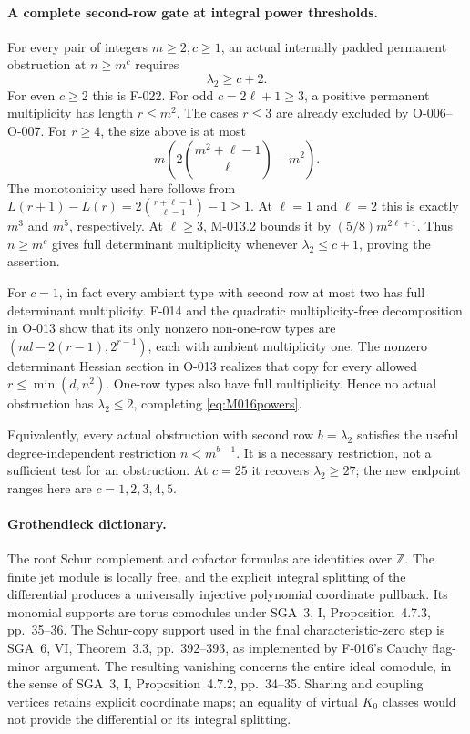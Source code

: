 \paragraph{A complete second-row gate at integral power thresholds.}
For every pair of integers \(m\geq2,c\geq1\), an actual
internally padded permanent obstruction at \(n\geq m^c\)
requires
\begin{equation}\label{eq:M016powers}
                              \lambda_2\geq c+2.
\end{equation}
For even \(c\geq2\) this is F-022. For odd
\(c=2\ell+1\geq3\), a positive permanent multiplicity
has length \(r\leq m^2\). The cases \(r\leq3\)
are already excluded by O-006--O-007. For \(r\geq4\),
the size above is at most
\[
 m\left(2\binom{m^2+\ell-1}{\ell}-m^2\right).
\]
The monotonicity used here follows from
\(L(r+1)-L(r)=2\binom{r+\ell-1}{\ell-1}-1\geq1\).
At \(\ell=1\) and \(\ell=2\) this is exactly
\(m^3\) and \(m^5\), respectively. At \(\ell\geq3\),
M-013.2 bounds it by \((5/8)m^{2\ell+1}\).
Thus \(n\geq m^c\) gives full determinant multiplicity
whenever \(\lambda_2\leq c+1\), proving the assertion.

For \(c=1\), in fact every ambient type with second row
at most two has full determinant multiplicity. F-014 and
the quadratic multiplicity-free decomposition in O-013
show that its only nonzero non-one-row types are
\((nd-2(r-1),2^{r-1})\), each with ambient multiplicity one.
The nonzero determinant Hessian section in O-013 realizes
that copy for every allowed \(r\leq\min(d,n^2)\).
One-row types also have full multiplicity. Hence no actual
obstruction has \(\lambda_2\leq2\), completing
\eqref{eq:M016powers}.

Equivalently, every actual obstruction with second row
\(b=\lambda_2\) satisfies the useful degree-independent
restriction \(n<m^{b-1}\). It is a necessary restriction,
not a sufficient test for an obstruction. At \(c=25\)
it recovers \(\lambda_2\geq27\); the new endpoint
ranges here are \(c=1,2,3,4,5\).

\paragraph{Grothendieck dictionary.}
The root Schur complement and cofactor formulas are
identities over \(\mathbb Z\). The finite jet module is
locally free, and the explicit integral splitting of the
differential produces a universally injective polynomial
coordinate pullback. Its monomial supports are torus
comodules under SGA~3, I, Proposition~4.7.3, pp.~35--36.
The Schur-copy support used in the final characteristic-zero
step is SGA~6, VI, Theorem~3.3, pp.~392--393, as implemented
by F-016's Cauchy flag-minor argument. The resulting
vanishing concerns the entire ideal comodule, in the sense
of SGA~3, I, Proposition~4.7.2, pp.~34--35.
Sharing and coupling vertices retains explicit coordinate
maps; an equality of virtual \(K_0\) classes would not
provide the differential or its integral splitting.

